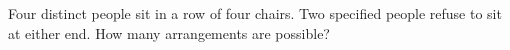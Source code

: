 Four distinct people sit in a row of four chairs. Two specified people refuse to sit at either end. How many arrangements are possible?
